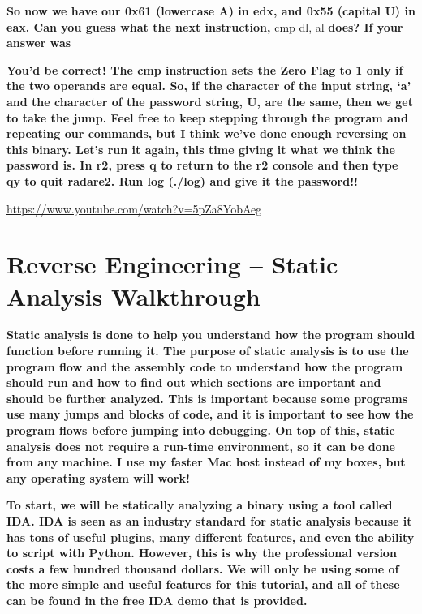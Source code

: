 \documentclass[letterpaper]{article}
\newcommand{\sitfig}[3]{
\begin{figure}[H]
\centering
\makebox[\textwidth][c]{
#2
}
\label{#1}
\end{figure}
}
\newcommand{\sitgfx}[4][scale=1.0]{
\sitfig{#3}{\texttt{[image: \#2]}}{#4}
}
\begin{document}
\textbf{So now we have our 0x61 (lowercase A) in edx, and 0x55 (capital U) in eax. Can you guess what the next
instruction, }cmp dl, al \textbf{does? If your answer was }  
\sitgfx[width=6.5in,height=1.8055in]{FINALWORKINGDOCFORMERLYPRECURSOR-img043.png}{fig:unk}{TODO CAPTION}
 

\textbf{You'd be correct! The cmp instruction sets the Zero Flag to 1 only if the two operands are equal. So, if the
character of the input string, `a' and the character of the password string, U, are the same, then we get to take the
jump. Feel free to keep stepping through the program and repeating our commands, but I think we've done enough
reversing on this binary. Let's run it again, this time giving it what we think the password is. In r2, press q to
return to the r2 console and then type qy to quit radare2. Run log (./log) and give it the password!! }
\sitgfx[width=6.4165in,height=1.3126in]{FINALWORKINGDOCFORMERLYPRECURSOR-img044.png}{fig:unk}{TODO CAPTION}
\url{https://www.youtube.com/watch?v=5pZa8YobAeg}

\section{Reverse Engineering -- Static Analysis Walkthrough}

\textbf{Static analysis is done to help you understand how the program should function before running it. The purpose of
static analysis is to use the program flow and the assembly code to understand how the program should run and how to
find out which sections are important and should be further analyzed. This is important because some programs use many
jumps and blocks of code, and it is important to see how the program flows before jumping into debugging. On top of
this, static analysis does not require a run-time environment, so it can be done from any machine. I use my faster Mac
host instead of my boxes, but any operating system will work!}

\textbf{To start, we will be statically analyzing a binary using a tool called IDA. IDA is seen as an industry standard
for static analysis because it has tons of useful plugins, many different features, and even the ability to script with
Python. However, this is why the professional version costs a few hundred thousand dollars. We will only be using some
of the more simple and useful features for this tutorial, and all of these can be found in the free IDA demo that is
provided.}
\end{document}
